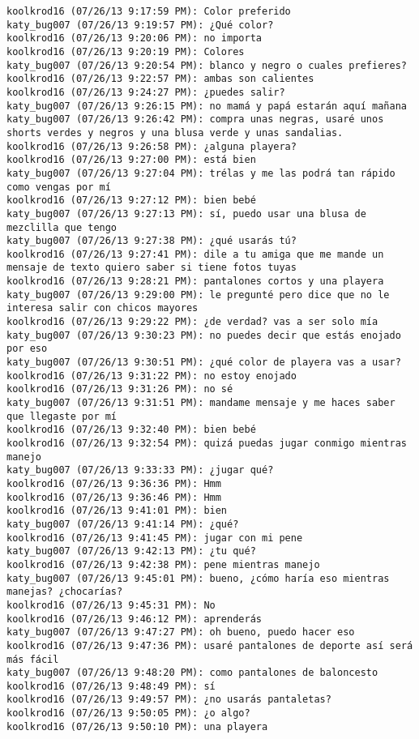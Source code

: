 \begin{verbatim}
koolkrod16 (07/26/13 9:17:59 PM): Color preferido
katy_bug007 (07/26/13 9:19:57 PM): ¿Qué color?
koolkrod16 (07/26/13 9:20:06 PM): no importa
koolkrod16 (07/26/13 9:20:19 PM): Colores 
katy_bug007 (07/26/13 9:20:54 PM): blanco y negro o cuales prefieres?
koolkrod16 (07/26/13 9:22:57 PM): ambas son calientes
koolkrod16 (07/26/13 9:24:27 PM): ¿puedes salir?
katy_bug007 (07/26/13 9:26:15 PM): no mamá y papá estarán aquí mañana
katy_bug007 (07/26/13 9:26:42 PM): compra unas negras, usaré unos shorts verdes y negros y una blusa verde y unas sandalias. 
koolkrod16 (07/26/13 9:26:58 PM): ¿alguna playera?
koolkrod16 (07/26/13 9:27:00 PM): está bien
katy_bug007 (07/26/13 9:27:04 PM): trélas y me las podrá tan rápido como vengas por mí 
koolkrod16 (07/26/13 9:27:12 PM): bien bebé
katy_bug007 (07/26/13 9:27:13 PM): sí, puedo usar una blusa de mezclilla que tengo
katy_bug007 (07/26/13 9:27:38 PM): ¿qué usarás tú?
koolkrod16 (07/26/13 9:27:41 PM): dile a tu amiga que me mande un mensaje de texto quiero saber si tiene fotos tuyas
koolkrod16 (07/26/13 9:28:21 PM): pantalones cortos y una playera
katy_bug007 (07/26/13 9:29:00 PM): le pregunté pero dice que no le interesa salir con chicos mayores
koolkrod16 (07/26/13 9:29:22 PM): ¿de verdad? vas a ser solo mía
katy_bug007 (07/26/13 9:30:23 PM): no puedes decir que estás enojado por eso
katy_bug007 (07/26/13 9:30:51 PM): ¿qué color de playera vas a usar?
koolkrod16 (07/26/13 9:31:22 PM): no estoy enojado
koolkrod16 (07/26/13 9:31:26 PM): no sé
katy_bug007 (07/26/13 9:31:51 PM): mandame mensaje y me haces saber que llegaste por mí
koolkrod16 (07/26/13 9:32:40 PM): bien bebé
koolkrod16 (07/26/13 9:32:54 PM): quizá puedas jugar conmigo mientras manejo
katy_bug007 (07/26/13 9:33:33 PM): ¿jugar qué?
koolkrod16 (07/26/13 9:36:36 PM): Hmm
koolkrod16 (07/26/13 9:36:46 PM): Hmm
koolkrod16 (07/26/13 9:41:01 PM): bien
katy_bug007 (07/26/13 9:41:14 PM): ¿qué?
koolkrod16 (07/26/13 9:41:45 PM): jugar con mi pene
katy_bug007 (07/26/13 9:42:13 PM): ¿tu qué?
koolkrod16 (07/26/13 9:42:38 PM): pene mientras manejo
katy_bug007 (07/26/13 9:45:01 PM): bueno, ¿cómo haría eso mientras manejas? ¿chocarías?
koolkrod16 (07/26/13 9:45:31 PM): No
koolkrod16 (07/26/13 9:46:12 PM): aprenderás
katy_bug007 (07/26/13 9:47:27 PM): oh bueno, puedo hacer eso
koolkrod16 (07/26/13 9:47:36 PM): usaré pantalones de deporte así será más fácil
katy_bug007 (07/26/13 9:48:20 PM): como pantalones de baloncesto
koolkrod16 (07/26/13 9:48:49 PM): sí
koolkrod16 (07/26/13 9:49:57 PM): ¿no usarás pantaletas?
koolkrod16 (07/26/13 9:50:05 PM): ¿o algo?
koolkrod16 (07/26/13 9:50:10 PM): una playera

\end{verbatim}
